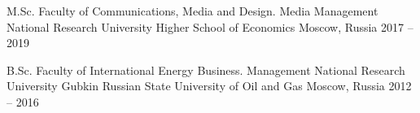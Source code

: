 \documentclass[11pt, a4paper]{awesome-cv}
\begin{document}
\begin{cventries}
\cventry
	{M.Sc. Faculty of Communications, Media and Design. Media Management}
	{National Research University Higher School of Economics}
	{Moscow, Russia}
	{2017 -- 2019}
	{
	}
	
\cventry
	{B.Sc. Faculty of International Energy Business. Management}
	{National Research University Gubkin Russian State University of Oil and Gas}
	{Moscow, Russia}
	{2012 -- 2016}
	{
	}
	
\end{cventries}








































\end{document}

